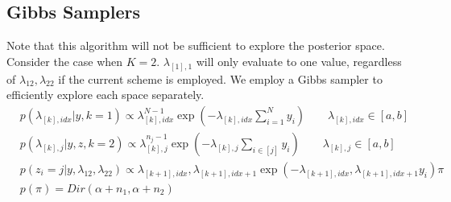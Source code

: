 \documentclass{article}
\begin{document}
\subsection{Gibbs Samplers}
Note that this algorithm will not be sufficient to explore the posterior space. Consider the case when $K=2$. $\lambda_{[1],1}$ will only evaluate to one value, regardless of $\lambda_{12}, \lambda_{22}$ if the current scheme is employed. We employ a Gibbs sampler to efficiently explore each space separately.
\begin{align}
& p(\lambda_{[k],idx}|y,k=1) \propto \lambda_{[k],idx}^{N-1}\exp(-\lambda_{[k],idx}\sum_{i=1}^{N}y_i)\qquad \lambda_{[k],idx}\in[a,b]\\
& p(\lambda_{[k],j}|y,z,k=2) \propto \lambda_{[k],j}^{n_j-1}\exp(-\lambda_{[k],j}\sum_{i\in[j]}y_i)\qquad \lambda_{[k],j}\in[a,b]\\
& p(z_i=j|y,\lambda_{12},\lambda_{22}) \propto \lambda_{[k+1],idx},\lambda_{[k+1],idx+1}\exp(-\lambda_{[k+1],idx},\lambda_{[k+1],idx+1}y_i)\pi\\
& p(\pi) = Dir(\alpha+n_1,\alpha+n_2)
\end{align}
\end{document}
